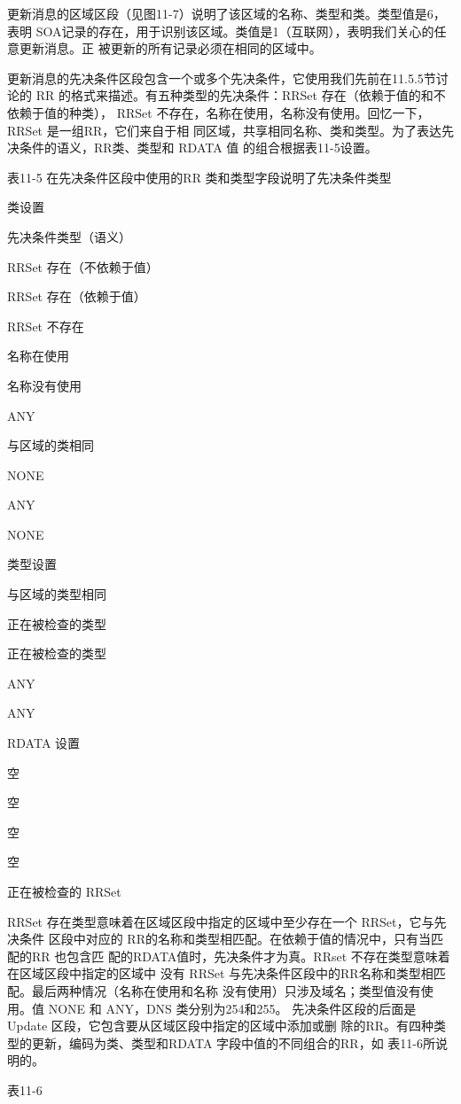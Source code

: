 更新消息的区域区段（见图11-7）说明了该区域的名称、类型和类。类型值是6，表明
SOA记录的存在，用于识别该区域。类值是1（互联网），表明我们关心的任意更新消息。正
被更新的所有记录必须在相同的区域中。

更新消息的先决条件区段包含一个或多个先决条件，它使用我们先前在11.5.5节讨论的
RR 的格式来描述。有五种类型的先决条件：RRSet 存在（依赖于值的和不依赖于值的种类），
RRSet 不存在，名称在使用，名称没有使用。回忆一下，RRSet 是一组RR，它们来自于相
同区域，共享相同名称、类和类型。为了表达先决条件的语义，RR类、类型和 RDATA 值
的组合根据表11-5设置。

表11-5 在先决条件区段中使用的RR 类和类型字段说明了先决条件类型

类设置

先决条件类型（语义）

RRSet 存在（不依赖于值）

RRSet 存在（依赖于值）

RRSet 不存在

名称在使用

名称没有使用

ANY

与区域的类相同

NONE

ANY

NONE

类型设置

与区域的类型相同

正在被检查的类型

正在被检查的类型

ANY

ANY

RDATA 设置

空

空

空

空

正在被检查的 RRSet

RRSet 存在类型意味着在区域区段中指定的区域中至少存在一个 RRSet，它与先决条件
区段中对应的 RR的名称和类型相匹配。在依赖于值的情况中，只有当匹配的RR 也包含匹
配的RDATA值时，先决条件才为真。RRset 不存在类型意味着在区域区段中指定的区域中
没有 RRSet 与先决条件区段中的RR名称和类型相匹配。最后两种情况（名称在使用和名称
没有使用）只涉及域名；类型值没有使用。值 NONE 和 ANY，DNS 类分别为254和255。
先决条件区段的后面是Update 区段，它包含要从区域区段中指定的区域中添加或删
除的RR。有四种类型的更新，编码为类、类型和RDATA 字段中值的不同组合的RR，如
表11-6所说明的。

表11-6

